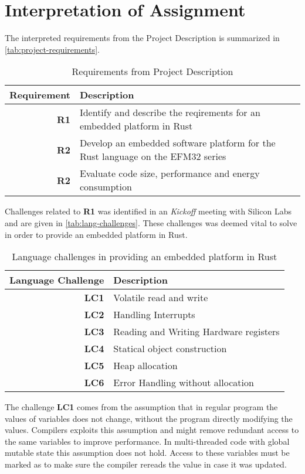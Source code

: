 \section{Interpretation of Assignment}

The interpreted requirements from the Project Description is summarized in \autoref{tab:project-requirements}.

\begin{table}[H]
  \centering
  \begin{tabular}{r | p{8cm}}
    \textbf{Requirement} & \textbf{Description} \\
    \hline
    \textbf{R1} & Identify and describe the reqirements for an embedded platform in Rust \\
    \textbf{R2} & Develop an embedded software platform for the Rust language on the EFM32 series \\
    \textbf{R2} & Evaluate code size, performance and energy consumption \\
    \hline
  \end{tabular}
  \caption{Requirements from Project Description}
  \label{tab:project-requirements}
\end{table}

Challenges related to \textbf{R1} was identified in an \emph{Kickoff} meeting with Silicon Labs and are given in \autoref{tab:lang-challenges}.
These challenges was deemed vital to solve in order to provide an embedded platform in Rust.

\begin{table}[H]
  \centering
  \begin{tabular}{r | l}
    \textbf{Language Challenge} & \textbf{Description} \\
    \hline
    \textbf{LC1} & Volatile read and write \\
    \textbf{LC2} & Handling Interrupts \\
    \textbf{LC3} & Reading and Writing Hardware registers \\
    \textbf{LC4} & Statical object construction \\
    \textbf{LC5} & Heap allocation \\
    \textbf{LC6} & Error Handling without allocation \\
    \hline
  \end{tabular}
  \caption{Language challenges in providing an embedded platform in Rust}
  \label{tab:lang-challenges}
\end{table}

The challenge \textbf{LC1} comes from the assumption that in regular program the values of variables does not change, without the program directly modifying the values.
Compilers exploits this assumption and might remove redundant access to the same variables to improve performance.
In multi-threaded code with global mutable state this assumption does not hold.
Access to these variables must be marked as  to make sure the compiler rereads the value in case it was updated.

